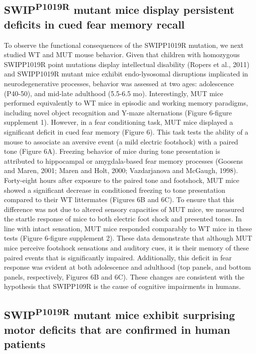 \subsection{SWIP\textsuperscript{P1019R} mutant mice display persistent deficits 
in cued fear memory recall}

To observe the functional consequences of the SWIPP1019R mutation, we next
studied WT and MUT mouse behavior. Given that children with homozygous
SWIPP1019R point mutations display intellectual disability (Ropers et al., 2011)
and SWIPP1019R mutant mice exhibit endo-lysosomal disruptions implicated in
neurodegenerative processes, behavior was assessed at two ages: adolescence
(P40-50), and mid-late adulthood (5.5-6.5 mo). Interestingly, MUT mice performed
equivalently to WT mice in episodic and working memory paradigms, including
novel object recognition and Y-maze alternations (Figure 6-figure supplement 1).
However, in a fear conditioning task, MUT mice displayed a significant deficit
in cued fear memory (Figure 6). This task tests the ability of a mouse to
associate an aversive event (a mild electric footshock) with a paired tone
(Figure 6A). Freezing behavior of mice during tone presentation is attributed to
hippocampal or amygdala-based fear memory processes (Goosens and Maren, 2001;
Maren and Holt, 2000; Vazdarjanova and McGaugh, 1998). Forty-eight hours after
exposure to the paired tone and footshock, MUT mice showed a significant
decrease in conditioned freezing to tone presentation compared to their WT
littermates (Figures 6B and 6C). To ensure that this difference was not due to
altered sensory capacities of MUT mice, we measured the startle response of mice
to both electric foot shock and presented tones. In line with intact sensation,
MUT mice responded comparably to WT mice in these tests (Figure 6-figure
supplement 2). These data demonstrate that although MUT mice perceive footshock
sensations and auditory cues, it is their memory of these paired events that is
significantly impaired. Additionally, this deficit in fear response was evident
at both adolescence and adulthood (top panels, and bottom panels, respectively,
Figures 6B and 6C). These changes are consistent with the hypothesis that
SWIPP109R is the cause of cognitive impairments in humans. 

\subsection{SWIP\textsuperscript{P1019R} mutant mice exhibit surprising motor 
deficits that are confirmed in human patients}

